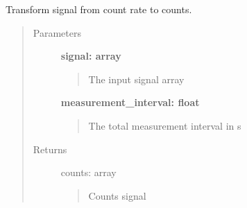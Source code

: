 \documentclass[letterpaper,10pt,english]{sphinxmanual}
\begin{document}

\begin{fulllineitems}
\label{pre_processing:pre_processing.rate_to_counts}
Transform signal from count rate to counts.
\begin{quote}\begin{description}
\item[{Parameters}] \leavevmode
\textbf{signal: array}
\begin{quote}

The input signal array
\end{quote}

\textbf{measurement\_interval: float}
\begin{quote}

The total measurement interval in s
\end{quote}

\item[{Returns}] \leavevmode
counts: array
\begin{quote}

Counts signal
\end{quote}

\end{description}\end{quote}

\end{fulllineitems}

\end{document}
